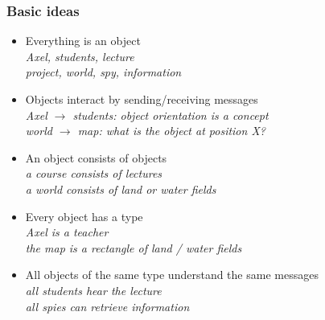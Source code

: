 \documentclass{slides}
\begin{document}
\begin{frame}
  \frametitle{Basic ideas}

  \begin{itemize}
  \item \alert{Everything is an object}\\
    \emph{Axel, students, lecture}\\
	  \emph{project, world, spy, information}
  \item \alert{Objects interact by sending/receiving messages}\\
    \emph{Axel $\rightarrow$ students: object orientation is a concept}\\
    \emph{world $\rightarrow$ map: what is the object at
      position X?}\\
  \item \alert{An object consists of objects}\\
    \emph{a course consists of lectures}\\
    \emph{a world consists of land or water fields}\\
  \item \alert{Every object has a type}\\
    \emph{Axel is a teacher}\\
    \emph{the map is a rectangle of land / water fields}
  \item \alert{All objects of the same type understand the same messages}\\
    \emph{all students hear the lecture}\\
    \emph{all spies can retrieve information}
  \end{itemize}
\end{frame}
\end{document}
